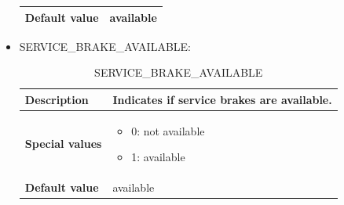 \documentclass{template/openetcs}
\begin{document}
\begin{itemize}
\begin{longtable}{|l|l|}
					\begin{minipage}[t]{0.22\linewidth} \textbf{Default value}	\end{minipage} 
				&	\begin{minipage}[t]{0.78\linewidth} available \end{minipage} \\
				
				\hline
				
			\end{longtable}
			
		\item SERVICE\_BRAKE\_AVAILABLE:
								
			\begin{longtable}{|l|l|}
				\caption{SERVICE\_BRAKE\_AVAILABLE}\\ 
				\hline
				
					\begin{minipage}[t]{0.22\linewidth} \textbf{Description}	\end{minipage} 
				&	\begin{minipage}[t]{0.78\linewidth} Indicates if service brakes are available. \end{minipage} \\
				
				\hline
																																									
					\begin{minipage}[t]{0.22\linewidth} \textbf{Special values}	\end{minipage} 
				&	\begin{minipage}[t]{0.78\linewidth} \begin{itemize} \item 0: not available \item 1: available \end{itemize} \end{minipage} \\
				
				\hline
				
					\begin{minipage}[t]{0.22\linewidth} \textbf{Default value}	\end{minipage} 
				&	\begin{minipage}[t]{0.78\linewidth} available \end{minipage} \\
				
				\hline
				
			\end{longtable}
			

\end{itemize}
\end{document}
